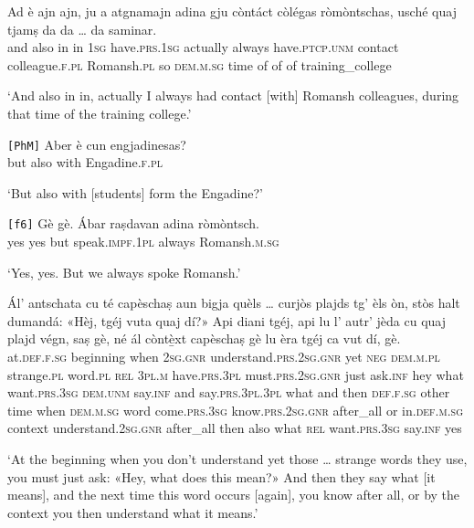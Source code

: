 \begin{linenumbers}
\gll    Ad è ajn ajn, ju a atgnamajn adina gju còntáct\footnotemark{} còlégas ròmòntschas, usché quaj tjamṣ da da … da saminar.\\
 and also in in \textsc{1sg} have.\textsc{prs.1sg} actually always have.\textsc{ptcp.unm} contact colleague.\textsc{f.pl} Romansh.\textsc{pl} so \textsc{dem.m.sg} time of of {} of training\_college\\
\end{linenumbers}
\medskip
\glt `And also in in, actually I always had contact [with] Romansh colleagues, during that time of the training college.'
\medskip

\begin{linenumbers}
\gll    \texttt{[PhM]} Aber è cun engjadinesas?\\
{} but also with Engadine.\textsc{f.pl}\\
\end{linenumbers}
\medskip
\glt `But also with [students] form the Engadine?'
\medskip

\begin{linenumbers}
\gll    \texttt{[f6]} Gè gè. Ábar raṣdavan adina ròmòntsch.\\
{} yes yes but speak.\textsc{impf.1pl} always Romansh.\textsc{m.sg}\\
\end{linenumbers}
\medskip
\glt `Yes, yes. But we always spoke Romansh.'
\medskip

\begin{linenumbers}
\gll    Ál’ antschata cu té capèschaṣ aun bigja quèls … curjòs plajds tg’ èls òn, stòs halt dumandá: «Hèj, tgéj vuta quaj dí?» Api diani tgéj, api lu l’ autr’ jèda cu quaj plajd végn, saṣ gè, né ál còntè̱xt capèschaṣ gè lu èra tgéj ca vut dí, gè.\\
at.\textsc{def.f.sg} beginning when \textsc{2sg.gnr} understand.\textsc{prs.2sg.gnr} yet \textsc{neg} \textsc{dem.m.pl} {} strange.\textsc{pl} word.\textsc{pl} \textsc{rel} \textsc{3pl.m} have.\textsc{prs.3pl} must.\textsc{prs.2sg.gnr} just ask.\textsc{inf} hey what want.\textsc{prs.3sg} \textsc{dem.unm} say.\textsc{inf} and say.\textsc{prs.3pl.3pl} what and then \textsc{def.f.sg} other time when \textsc{dem.m.sg} word come.\textsc{prs.3sg} know.\textsc{prs.2sg.gnr} after\_all or in.\textsc{def.m.sg} context understand.\textsc{2sg.gnr} after\_all then also what \textsc{rel} want.\textsc{prs.3sg} say.\textsc{inf} yes\\
\end{linenumbers}
\medskip
\glt `At the beginning when you don’t understand yet those … strange words they use, you must just ask: «Hey, what does this mean?» And then they say what [it means], and the next time this word occurs [again], you know after all, or by the context you then understand what it means.'
\medskip

